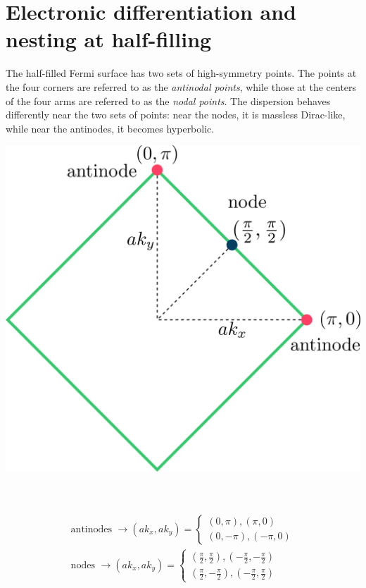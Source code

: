 \documentclass[12pt]{article}
\numberwithin{equation}{section}
\begin{document}
\section*{Electronic differentiation and nesting at half-filling}
\begin{minipage}{0.5\textwidth}
	The half-filled Fermi surface has two sets of high-symmetry points. The points at the four corners are referred to as the \textit{antinodal points}, while those at the centers of the four arms are referred to as the \textit{nodal points}. The dispersion behaves differently near the two sets of points: near the nodes, it is massless Dirac-like, while near the antinodes, it becomes hyperbolic.
\end{minipage}
\hspace*{\fill}
\begin{minipage}{0.4\textwidth}
	\centering
	\includegraphics[width=\textwidth]{./Fsurf.png}
\end{minipage}
\\\\
\begin{equation*}\begin{aligned}
	\text{antinodes } \to \left(ak_x, ak_y\right) = \begin{cases}
\left(0, \pi \right), \left(\pi, 0 \right)\\
\left(0, -\pi \right), \left(-\pi, 0\right)
	\end{cases}\\
		\text{nodes } \to \left(ak_x, ak_y\right) = \begin{cases}
		\left(\frac{\pi}{2}, \frac{\pi}{2} \right), \left(-\frac{\pi}{2}, -\frac{\pi}{2}\right)\\
		\left(\frac{\pi}{2}, -\frac{\pi}{2} \right), \left(-\frac{\pi}{2}, \frac{\pi}{2}\right)
	\end{cases}
\end{aligned}\end{equation*}
\end{document}

